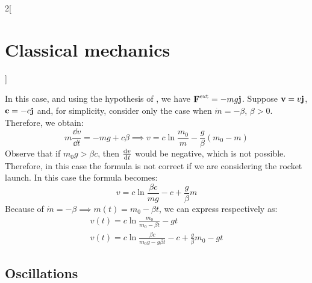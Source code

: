\documentclass[../../../main_physics.tex]{subfiles}
\begin{document}
\begin{multicols}{2}[\section{Classical mechanics}]
\begin{proposition}
    In this case, and using the hypothesis of , we have $\boldsymbol{\mathrm{F}}^\text{ext}=-mg\boldsymbol{\mathrm{j}}$. Suppose $\boldsymbol{\mathrm{v}}=v\boldsymbol{\mathrm{j}}$, $\boldsymbol{\mathrm{c}}=-c\boldsymbol{\mathrm{j}}$ and, for simplicity, consider only the case when $\dot{m}=-\beta$, $\beta>0$. Therefore, we obtain:
    \begin{equation}
      m\frac{\dd{v}}{\dd{t}}=-mg+c\beta\implies v=c\ln\frac{m_0}{m}-\frac{g}{\beta}(m_0-m)
      \label{CM_rockg1}
    \end{equation}
    Observe that if $m_0g>\beta c$, then $\dv{v}{t}$ would be negative, which is not possible. Therefore, in this case the formula is not correct if we are considering the rocket launch. In this case the formula becomes:
    \begin{equation}
      v=c\ln\frac{\beta c}{mg}-c+\frac{g}{\beta}m
      \label{CM_rockg2}
    \end{equation}
    Because of $\dot{m}=-\beta\implies m(t)=m_0-\beta t$, we can express  respectively as:
    \begin{gather*}
      v(t)=c\ln\frac{m_0}{m_0-\beta t}-gt\\
      v(t)=c\ln\frac{\beta c}{m_0g-g\beta t}-c+\frac{g}{\beta}m_0-gt
    \end{gather*}
  \end{proposition}
  \subsection{Oscillations}

\end{multicols}
\end{document}
